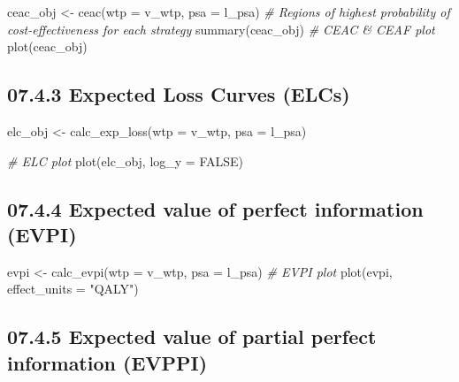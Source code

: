 \documentclass[
]{article}
\newenvironment{Shaded}{\begin{snugshade}}{\end{snugshade}}
\newcommand{\AttributeTok}[1]{\textcolor[rgb]{0.77,0.63,0.00}{#1}}
\newcommand{\CommentTok}[1]{\textcolor[rgb]{0.56,0.35,0.01}{\textit{#1}}}
\newcommand{\ConstantTok}[1]{\textcolor[rgb]{0.00,0.00,0.00}{#1}}
\newcommand{\FunctionTok}[1]{\textcolor[rgb]{0.00,0.00,0.00}{#1}}
\newcommand{\NormalTok}[1]{#1}
\newcommand{\OtherTok}[1]{\textcolor[rgb]{0.56,0.35,0.01}{#1}}
\newcommand{\StringTok}[1]{\textcolor[rgb]{0.31,0.60,0.02}{#1}}
\begin{document}
\begin{Shaded}
\begin{Highlighting}[]
\NormalTok{ceac\_obj }\OtherTok{\textless{}{-}} \FunctionTok{ceac}\NormalTok{(}\AttributeTok{wtp =}\NormalTok{ v\_wtp, }\AttributeTok{psa =}\NormalTok{ l\_psa)}
\CommentTok{\# Regions of highest probability of cost{-}effectiveness for each strategy}
\FunctionTok{summary}\NormalTok{(ceac\_obj)}
\CommentTok{\# CEAC \& CEAF plot}
\FunctionTok{plot}\NormalTok{(ceac\_obj)}
\end{Highlighting}
\end{Shaded}

\hypertarget{expected-loss-curves-elcs}{%
\subsection{07.4.3 Expected Loss Curves
(ELCs)}\label{expected-loss-curves-elcs}}

\begin{Shaded}
\begin{Highlighting}[]
\NormalTok{elc\_obj }\OtherTok{\textless{}{-}} \FunctionTok{calc\_exp\_loss}\NormalTok{(}\AttributeTok{wtp =}\NormalTok{ v\_wtp, }\AttributeTok{psa =}\NormalTok{ l\_psa)}

\CommentTok{\# ELC plot}
\FunctionTok{plot}\NormalTok{(elc\_obj, }\AttributeTok{log\_y =} \ConstantTok{FALSE}\NormalTok{)}
\end{Highlighting}
\end{Shaded}

\hypertarget{expected-value-of-perfect-information-evpi}{%
\subsection{07.4.4 Expected value of perfect information
(EVPI)}\label{expected-value-of-perfect-information-evpi}}

\begin{Shaded}
\begin{Highlighting}[]
\NormalTok{evpi }\OtherTok{\textless{}{-}} \FunctionTok{calc\_evpi}\NormalTok{(}\AttributeTok{wtp =}\NormalTok{ v\_wtp, }\AttributeTok{psa =}\NormalTok{ l\_psa)}
\CommentTok{\# EVPI plot}
\FunctionTok{plot}\NormalTok{(evpi, }\AttributeTok{effect\_units =} \StringTok{"QALY"}\NormalTok{) }
\end{Highlighting}
\end{Shaded}

\hypertarget{expected-value-of-partial-perfect-information-evppi}{%
\subsection{07.4.5 Expected value of partial perfect information
(EVPPI)}\label{expected-value-of-partial-perfect-information-evppi}}
\end{document}
